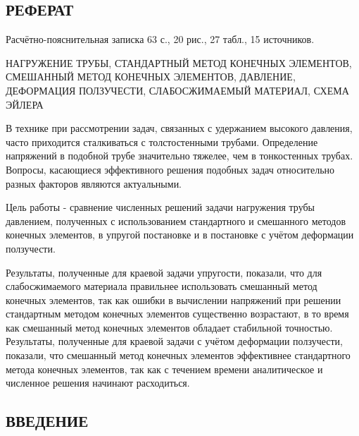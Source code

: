 \documentclass[a4paper,14pt]{extarticle}
\begin{document}
\newpage

\begin{center}
\section*{\centering РЕФЕРАТ}
\end{center}
\setcounter{page}{2}

Расчётно-пояснительная записка 63 с., 20 рис., 27 табл., 15 источников.

НАГРУЖЕНИЕ ТРУБЫ, СТАНДАРТНЫЙ МЕТОД КОНЕЧНЫХ ЭЛЕМЕНТОВ, СМЕШАННЫЙ МЕТОД КОНЕЧНЫХ ЭЛЕМЕНТОВ, ДАВЛЕНИЕ, ДЕФОРМАЦИЯ ПОЛЗУЧЕСТИ, СЛАБОСЖИМАЕМЫЙ МАТЕРИАЛ, СХЕМА ЭЙЛЕРА

В технике при рассмотрении задач, связанных с удержанием высокого давления, часто приходится сталкиваться с толстостенными трубами. Определение напряжений в подобной трубе значительно тяжелее, чем в тонкостенных трубах. Вопросы, касающиеся эффективного решения подобных задач относительно разных факторов являются актуальными. 

Цель работы - сравнение численных решений задачи нагружения трубы давлением, полученных с использованием стандартного и смешанного методов конечных элементов, в упругой постановке и в постановке с учётом деформации ползучести.

Результаты, полученные для краевой задачи упругости, показали, что для слабосжимаемого материала правильнее использовать смешанный метод конечных элементов, так как ошибки в вычислении напряжений при решении стандартным методом конечных элементов существенно возрастают, в то время как смешанный метод конечных элементов обладает стабильной точностью. Результаты, полученные для краевой задачи с учётом деформации ползучести, показали, что смешанный метод конечных элементов эффективнее стандартного метода конечных элементов, так как с течением времени аналитическое и численное решения начинают расходиться. 

\newpage

\renewcommand*\contentsname{\begin{center}СОДЕРЖАНИЕ\end{center}}
	
\tableofcontents


\newpage

\begin{center}
\section*{\centering ВВЕДЕНИЕ}
\end{center}
\end{document}
